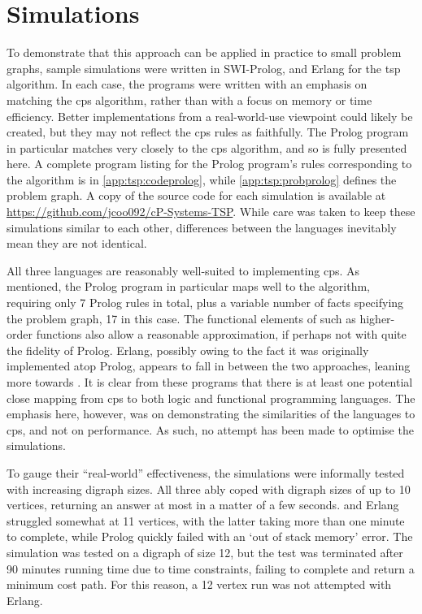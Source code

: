 \section{\label{sec:tsp:simulation}Simulations}
To demonstrate that this approach can be applied in practice to small problem graphs, sample simulations were written in SWI-Prolog, \fsharp{} and Erlang for the \gls{tsp} algorithm.  In each case, the programs were written with an emphasis on matching the \gls{cps} algorithm, rather than with a focus on memory or time efficiency.  Better implementations from a real-world-use viewpoint could likely be created, but they may not reflect the \gls{cps} rules as faithfully.  The Prolog program in particular matches very closely to the \gls{cps} algorithm, and so is fully presented here.  A complete program listing for the Prolog program's rules corresponding to the algorithm is in \cref{app:tsp:codeprolog}, while \cref{app:tsp:probprolog} defines the problem graph.  A copy of the source code for each simulation is available at \url{https://github.com/jcoo092/cP-Systems-TSP}.  While care was taken to keep these simulations similar to each other, differences between the languages inevitably mean they are not identical.

All three languages are reasonably well-suited to implementing \gls{cps}.  As mentioned, the Prolog program in particular maps well to the algorithm, requiring only 7 Prolog rules in total, plus a variable number of facts specifying the problem graph, 17 in this case.  The functional elements of \fsharp{} such as higher-order functions also allow a reasonable approximation, if perhaps not with quite the fidelity of Prolog.  Erlang, possibly owing to the fact it was originally implemented atop Prolog, appears to fall in between the two approaches, leaning more towards \fsharp{}.  It is clear from these programs that there is at least one potential close mapping from \gls{cps} to both logic and functional programming languages.  The emphasis here, however, was on demonstrating the similarities of the languages to \gls{cps}, and not on performance.  As such, no attempt has been made to optimise the simulations.

To gauge their ``real-world'' effectiveness, the simulations were informally tested with increasing digraph sizes.  All three ably coped with digraph sizes of up to 10 vertices, returning an answer at most in a matter of a few seconds.  \fsharp{} and Erlang struggled somewhat at 11 vertices, with the latter taking more than one minute to complete, while Prolog quickly failed with an `out of stack memory' error.  The \fsharp{} simulation was tested on a digraph of size 12, but the test was terminated after 90 minutes running time due to time constraints, failing to complete and return a minimum cost path.  For this reason, a 12 vertex run was not attempted with Erlang.

